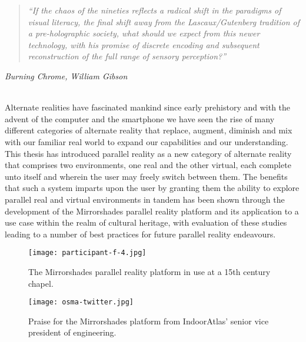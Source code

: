 \begin{quote}
	\textit{``If the chaos of the nineties reflects a radical shift in the paradigms of visual literacy, the final shift away from the Lascaux/Gutenberg tradition of a pre-holographic society, what should we expect from this newer technology, with his promise of discrete encoding and subsequent reconstruction of the full range of sensory perception?''}
\end{quote}
\hfill \textit{Burning Chrome, William Gibson}
\\
\\


\label{chapter-conclusions}

Alternate realities have fascinated mankind since early prehistory and with the advent of the computer and the smartphone we have seen the rise of many different categories of alternate reality that replace, augment, diminish and mix with our familiar real world to expand our capabilities and our understanding. This thesis has introduced parallel reality as a new category of alternate reality that comprises two environments, one real and the other virtual, each complete unto itself and wherein the user may freely switch between them. The benefits that such a system imparts upon the user by granting them the ability to explore parallel real and virtual environments in tandem has been shown through the development of the Mirrorshades parallel reality platform and its application to a use case within the realm of cultural heritage, with evaluation of these studies leading to a number of best practices for future parallel reality endeavours.

\begin{figure}[t]
	\begin{center}
		\texttt{[image: participant-f-4.jpg]}
		\caption{The Mirrorshades parallel reality platform in use at a 15th century chapel.}
		\label{participant-f-4.jpg}
	\end{center}	
\end{figure}

\begin{figure}[t]
	\begin{center}
		\texttt{[image: osma-twitter.jpg]}
		\caption{Praise for the Mirrorshades platform from IndoorAtlas' senior vice president of engineering.}
		\label{osma-twitter.jpg}
	\end{center}	
\end{figure}

